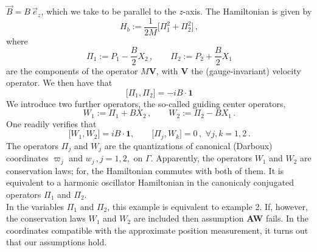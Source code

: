 \documentclass[12pt]{article}
\begin{document}
\begin{enumerate}
		$\vec{B}= B\,\vec{e}_{z}$, which we take to be parallel to the $z$-axis. The Hamiltonian is given by
		\begin{equation}\label{magn-field}
		H_{b} :=  \frac{1}{2M} \big[ \Pi_1 ^2 + \Pi_2 ^2 \big]\,,
		\end{equation}
		where 
		\begin{equation}\label{velocities}
		\Pi_1 := P_1 - \frac{B}{2} X_2 \,,\qquad \Pi_2 := P_2 + \frac{B}{2} X_1 
		\end{equation}
		are the components of the operator $M\mathbf{V}$, with $\mathbf{V}$ the (gauge-invariant) velocity operator.
		We then have that
		\begin{equation}\label{magn-transl}
		\big[\Pi_1 , \Pi_2 \big] = -i B \cdot \mathbf{1}
		\end{equation}
		We introduce two further operators, the so-called guiding center operators,
		\begin{equation}\label{guiding-centers}
		W_1 := \Pi_1 + B X_2\,, \qquad W_2 := \Pi_2 - B X_1\,.
		\end{equation}
		One readily verifies that 
		\begin{equation}\label{W}
		\big[W_1 , W_2 \big] = iB\cdot \mathbf{1}, \qquad \big[\Pi_j, W_k \big] =0\,,\,\, \forall j, k =1,2\,.
		\end{equation}
		The operators $\Pi_j$ and $W_j$ are the quantizations of canonical (Darboux) coordinates $\varpi_j$ and $w_j\,, j=1,2,$ on $\Gamma$. Apparently, the operators $W_1$ and $W_2$ are conservation laws; for, the Hamiltonian commutes with both of them. It is equivalent to a harmonic oscillator Hamiltonian in the canonicaly conjugated operators $\Pi_1$ and 
		$\Pi_2$.\\
		In the variables $\Pi_1$ and $\Pi_2$, this example is equivalent to example 2. If, however, the conservation laws $W_1$ and $W_2$ are included then assumption {\bf{AW}} fails. In the coordinates compatible with the approximate position measurement, it turns out that our assumptions hold.\\
		

\end{enumerate}
\end{document}
